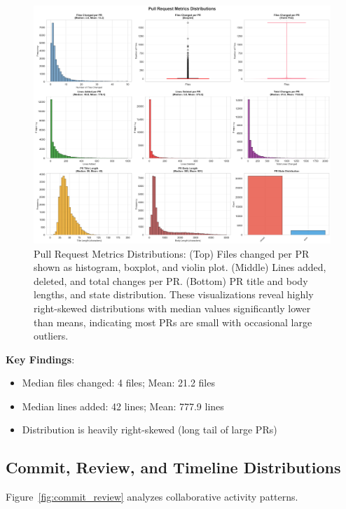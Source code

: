 \documentclass[11pt]{article}
\begin{document}
\begin{figure}[H]
\centering
\includegraphics[width=\textwidth]{figures/pr_distributions.png}
\caption{Pull Request Metrics Distributions: (Top) Files changed per PR shown as histogram, boxplot, and violin plot. (Middle) Lines added, deleted, and total changes per PR. (Bottom) PR title and body lengths, and state distribution. These visualizations reveal highly right-skewed distributions with median values significantly lower than means, indicating most PRs are small with occasional large outliers.}
\label{fig:pr_dist}
\end{figure}

\textbf{Key Findings}: 
\begin{itemize}
    \item Median files changed: 4 files; Mean: 21.2 files
    \item Median lines added: 42 lines; Mean: 777.9 lines
    \item Distribution is heavily right-skewed (long tail of large PRs)
\end{itemize}

\subsection{Commit, Review, and Timeline Distributions}

Figure~\ref{fig:commit_review} analyzes collaborative activity patterns.
\end{document}

